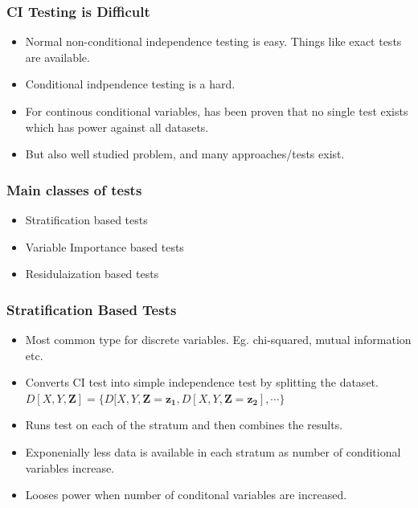 \documentclass{beamer}
\begin{document}
\begin{frame}
	\frametitle{CI Testing is Difficult}
	\begin{itemize}
		\setlength\itemsep{1em}
		\item Normal non-conditional independence testing is easy.
			Things like exact tests are available. 
		\item Conditional indpendence testing is a hard.
		\item For continous conditional variables, has been proven that no single 
		      test exists which has power against all datasets. \footnotemark
		\item But also well studied problem, and many approaches/tests exist.
	\end{itemize}

\end{frame}

\begin{frame}
	\frametitle{Main classes of tests}
	\begin{itemize}
		\setlength\itemsep{1em}
		\item Stratification based tests
		\item Variable Importance based tests
		\item Residulaization based tests
	\end{itemize}
\end{frame}

\begin{frame}
	\frametitle{Stratification Based Tests}
	\begin{itemize}
		\setlength\itemsep{1em}
		\item Most common type for discrete variables. Eg. chi-squared,
			mutual information etc. 
		\item Converts CI test into simple independence test by splitting 
			the dataset.
		$ D[X, Y, \bm{Z}] = \{ D[X, Y, \bm{Z}=\bm{z_1}, D[X, Y, \bm{Z}=\bm{z_2}], \cdots \} $	
		\item Runs test on each of the stratum and then combines the results.
		\item Exponenially less data is available in each stratum as 
			number of conditional variables increase.
		\item Looses power when number of conditonal variables
			are increased.
	\end{itemize}
\end{frame}
\end{document}
